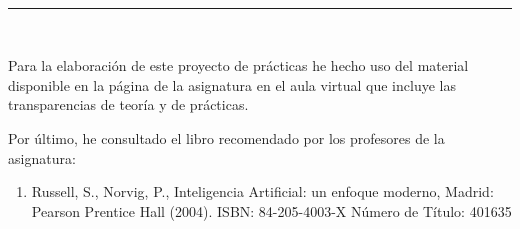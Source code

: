  \begin{center}
	{\fboxrule=4pt } \\
	\rule{15cm}{0pt} \\
\end{center}
\par Para la elaboración de este proyecto de prácticas he hecho uso del material disponible en la página de la asignatura en el aula virtual que incluye las transparencias de teoría y de prácticas.
\par Por último, he consultado el libro recomendado por los profesores de la asignatura:
\begin{enumerate}
	\item Russell, S., Norvig, P., Inteligencia Artificial: un enfoque moderno, Madrid: Pearson Prentice Hall (2004). ISBN: 84-205-4003-X
	Número de Título: 401635
\end{enumerate}

